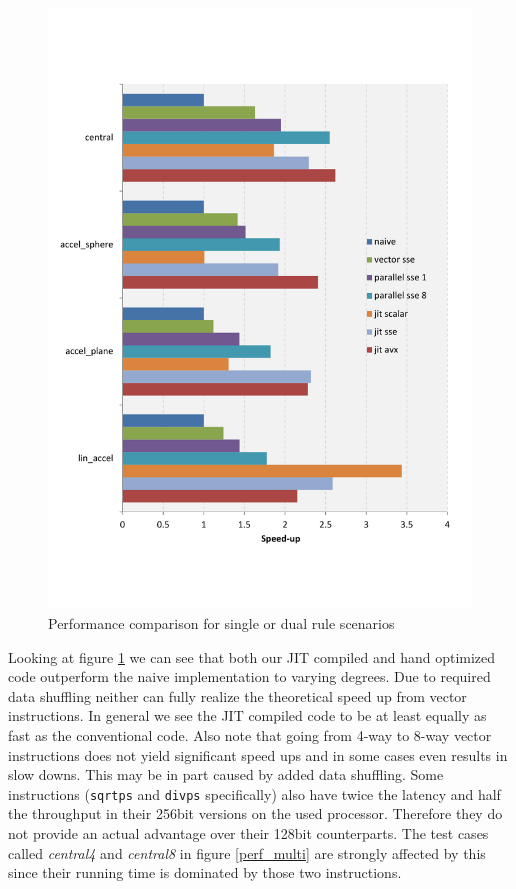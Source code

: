 \begin{figure}[th]\centering
  \includegraphics[scale=0.6]{single_dual_rules.pdf}
  \caption{Performance comparison for single or dual rule scenarios
  \label{perf_single}}
\end{figure}

Looking at figure \ref{perf_single} we can see that both our JIT compiled and hand optimized code outperform the naive implementation to varying degrees. Due to required data shuffling neither can fully realize the theoretical speed up from vector instructions. In general we see the JIT compiled code to be at least equally as fast as the conventional code. Also note that going from 4-way to 8-way vector instructions does not yield significant speed ups and in some cases even results in slow downs. This may be in part caused by added data shuffling. Some instructions (\texttt{sqrtps} and \texttt{divps} specifically) also have twice the latency and half the throughput in their 256bit versions on the used processor. Therefore they do not provide an actual advantage over their 128bit counterparts. The test cases called \emph{central4} and \emph{central8} in figure \ref{perf_multi} are strongly affected by this since their running time is dominated by those two instructions.

